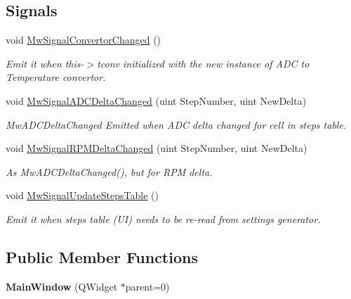 \subsection*{Signals}
\begin{DoxyCompactItemize}
\item 
\mbox{\label{class_main_window_abc97afb888a70565123689a1444ab4b9}} 
void \hyperlink{class_main_window_abc97afb888a70565123689a1444ab4b9}{Mw\+Signal\+Convertor\+Changed} ()
\begin{DoxyCompactList}\small\item\em Emit it when this-\/$>$tconv initialized with the new instance of A\+DC to Temperature convertor. \end{DoxyCompactList}\item 
void \hyperlink{class_main_window_a37ea64ccb9b5bcf9bb976602d42aadfa}{Mw\+Signal\+A\+D\+C\+Delta\+Changed} (uint Step\+Number, uint New\+Delta)
\begin{DoxyCompactList}\small\item\em Mw\+A\+D\+C\+Delta\+Changed Emitted when A\+DC delta changed for cell in steps table. \end{DoxyCompactList}\item 
void \hyperlink{class_main_window_a7b5fab96f0c2363958436141a3aae65b}{Mw\+Signal\+R\+P\+M\+Delta\+Changed} (uint Step\+Number, uint New\+Delta)
\begin{DoxyCompactList}\small\item\em As Mw\+A\+D\+C\+Delta\+Changed(), but for R\+PM delta. \end{DoxyCompactList}\item 
\mbox{\label{class_main_window_abf2e8820a7173fb2231e7f835160d8a1}} 
void \hyperlink{class_main_window_abf2e8820a7173fb2231e7f835160d8a1}{Mw\+Signal\+Update\+Steps\+Table} ()
\begin{DoxyCompactList}\small\item\em Emit it when steps table (UI) needs to be re-\/read from settings generator. \end{DoxyCompactList}\end{DoxyCompactItemize}
\subsection*{Public Member Functions}
\begin{DoxyCompactItemize}
\item 
\mbox{\label{class_main_window_a8b244be8b7b7db1b08de2a2acb9409db}} 
{\bfseries Main\+Window} (Q\+Widget $\ast$parent=0)
\end{DoxyCompactItemize}
